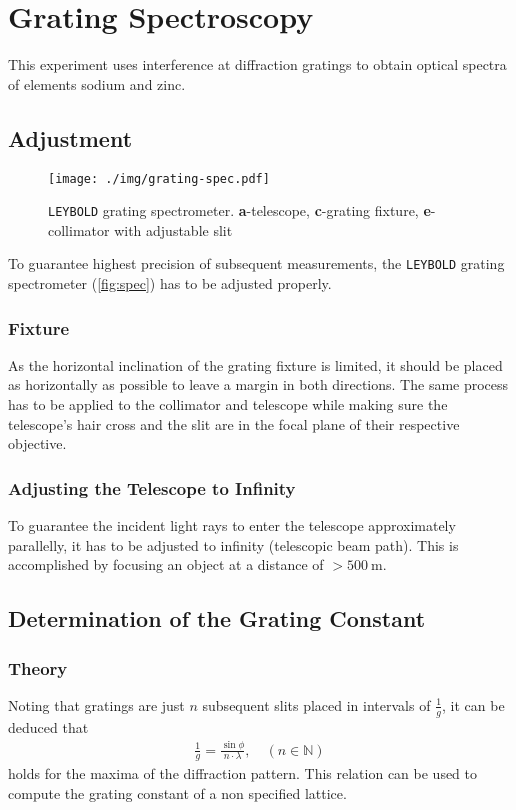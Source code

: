 \chapter{Grating Spectroscopy}
This experiment uses interference at diffraction gratings to obtain optical spectra of elements sodium and zinc.

\section{Adjustment}
\begin{figure}
	\centering
	\texttt{[image: ./img/grating-spec.pdf]}
	\caption[\texttt{LEYBOLD} grating spectrometer]{\texttt{LEYBOLD} grating spectrometer. \textbf{a}-telescope, \textbf{c}-grating fixture, \textbf{e}-collimator with adjustable slit}
	\label{fig:spec}
\end{figure}
To guarantee highest precision of subsequent measurements, the \texttt{LEYBOLD} grating spectrometer (\autoref{fig:spec}) has to be adjusted properly.

\subsection{Fixture}
As the horizontal inclination of the grating fixture is limited, it should be placed as horizontally as possible to leave a margin in both directions.
The same process has to be applied to the collimator and telescope while making sure the telescope's hair cross and the slit are in the focal plane of their respective objective.

\subsection{Adjusting the Telescope to Infinity}
To guarantee the incident light rays to enter the telescope approximately parallelly, it has to be adjusted to infinity (telescopic beam path).
This is accomplished by focusing an object at a distance of $>\SI{500}{\meter}$.

\section{Determination of the Grating Constant}\label{sec:grating}
\subsection{Theory}
Noting that gratings are just $n$ subsequent slits placed in intervals of $\frac{1}{g}$, it can be deduced that
\begin{align}
	\frac{1}{g}=\frac{\sin\phi}{n\cdot\lambda},\quad(n\in\mathbb{N}) \label{eq:grating-const}
\end{align}
holds for the maxima of the diffraction pattern.
This relation can be used to compute the grating constant of a non specified lattice.
